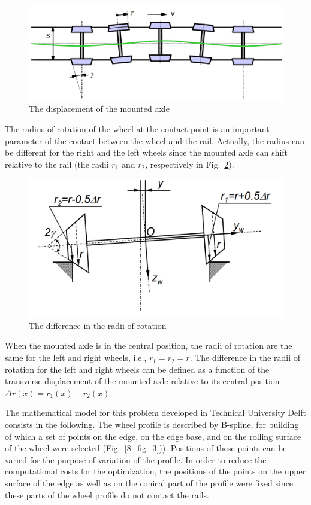 \begin{figure}[t]
\includegraphics[width=0.9\linewidth]{figures/8_1.png}
\caption{The displacement of the mounted axle}
\label{8_fig_1}     
\end{figure}

The radius of rotation of the wheel at the contact point is an important parameter of the contact between the wheel and the rail. Actually, the radius can be different for the right and the left wheels since the mounted axle can shift relative to the rail (the radii $r_1$ and $r_2$, respectively in Fig.~\ref{8_fig_2}).

\begin{figure}[t]
\includegraphics[width=0.7\linewidth]{figures/8_2.png}
\caption{The difference in the radii of rotation}
\label{8_fig_2}     
\end{figure}

When the mounted axle is in the central position, the radii of rotation are the same for the left and right wheels, i.e., $r_1=r_2=r$. The difference in the radii of rotation for the left and right wheels can be defined as a function of the transverse displacement of the mounted axle relative to its central position $\Delta r(x)=r_1(x)-r_2(x)$.

The mathematical model for this problem developed in Technical University Delft consists in the following. The wheel profile is described by B-spline, for building of which a set of points on the edge, on the edge base, and on the rolling surface of the wheel were selected (Fig.~\ref{8_fig_3})). Positions of these points can be varied for the purpose of variation of the profile. In order to reduce the computational costs for the optimization, the positions of the points on the upper surface of the edge as well as on the conical part of the profile were fixed since these parts of the wheel profile do not contact the rails.

